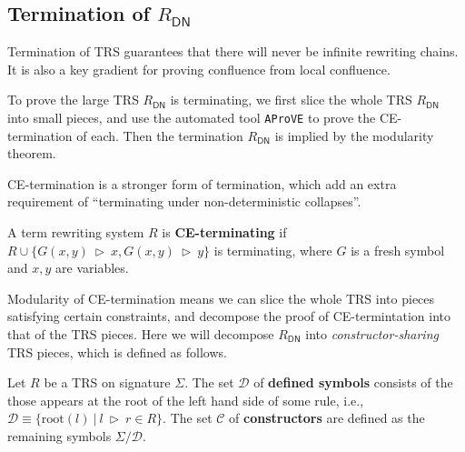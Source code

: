 \documentclass[manuscript, review, timestamp]{acmart}
\newcommand*{\fst}{\texttt{fst }}
\newcommand*{\snd}{\texttt{snd }}
\newcommand*{\reduce}{\ \triangleright\ }
\begin{document}



\subsection{Termination of $R_\textsf{DN}$}

Termination of TRS guarantees that there will never be infinite rewriting chains. It is also a key gradient for proving confluence from local confluence. 

To prove the large TRS $R_\textsf{DN}$ is terminating, we first slice the whole TRS $R_\textsf{DN}$ into small pieces, and use the automated tool \texttt{AProVE} to prove the CE-termination of each. Then the termination $R_\textsf{DN}$ is implied by the modularity theorem.

CE-termination is a stronger form of termination, which add an extra requirement of ``terminating under non-deterministic collapses''.

\begin{definition}[CE-termination] \cite{Gramlich1994}
  A term rewriting system $R$ is \textbf{CE-terminating} if $R \cup \{G(x, y) \reduce x, G(x, y) \reduce y\}$ is terminating, where $G$ is a fresh symbol and $x, y$ are variables.
\end{definition}

Modularity of CE-termination means we can slice the whole TRS into pieces satisfying certain constraints, and decompose the proof of CE-termintation into that of the TRS pieces. Here we will decompose $R_\textsf{DN}$ into \textit{constructor-sharing} TRS pieces, which is defined as follows.

\begin{definition}
  Let $R$ be a TRS on signature $\Sigma$. The set $\mathcal{D}$ of \textbf{defined symbols} consists of the those appears at the root of the left hand side of some rule, i.e., $\mathcal{D} \equiv \{ \mathrm{root}(l)\ |\ l \reduce r \in R \}$. The set $\mathcal{C}$ of \textbf{constructors} are defined as the remaining symbols $\Sigma / \mathcal{D}$.
\end{definition}
\end{document}
